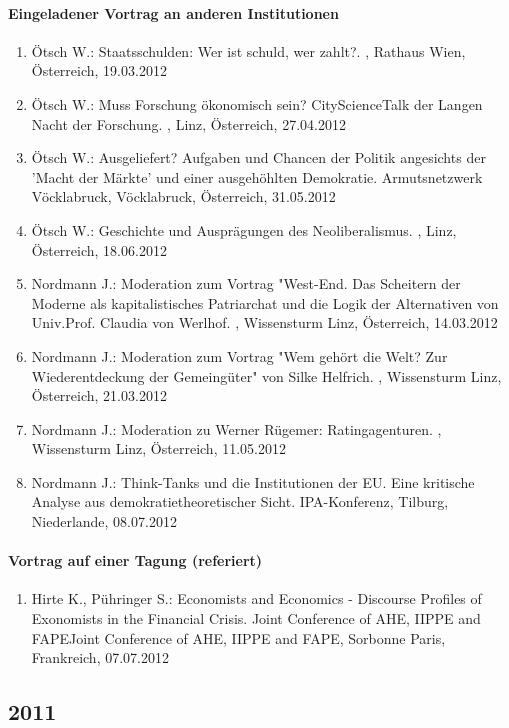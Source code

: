 \paragraph{Eingeladener Vortrag an anderen Institutionen}
\begin{enumerate}
	\item Ötsch W.: Staatsschulden: Wer ist schuld, wer zahlt?. , Rathaus Wien, Österreich, 19.03.2012
	\item Ötsch W.: Muss Forschung ökonomisch sein? CityScienceTalk der Langen Nacht der Forschung. , Linz, Österreich, 27.04.2012
	\item Ötsch W.: Ausgeliefert? Aufgaben und Chancen der Politik angesichts der 'Macht der Märkte' und einer ausgehöhlten Demokratie. Armutsnetzwerk Vöcklabruck, Vöcklabruck, Österreich, 31.05.2012
	\item Ötsch W.: Geschichte und Ausprägungen des Neoliberalismus. , Linz, Österreich, 18.06.2012
	\item Nordmann J.: Moderation zum Vortrag "West-End. Das Scheitern der Moderne als kapitalistisches Patriarchat und die Logik der Alternativen von Univ.Prof. Claudia von Werlhof. , Wissensturm Linz, Österreich, 14.03.2012
	\item Nordmann J.: Moderation zum Vortrag "Wem gehört die Welt? Zur Wiederentdeckung der Gemeingüter" von Silke Helfrich. , Wissensturm Linz, Österreich, 21.03.2012
	\item Nordmann J.: Moderation zu Werner Rügemer: Ratingagenturen. , Wissensturm Linz, Österreich, 11.05.2012
	\item Nordmann J.: Think-Tanks und die Institutionen der EU. Eine kritische Analyse aus demokratietheoretischer Sicht. IPA-Konferenz, Tilburg, Niederlande, 08.07.2012
\end{enumerate}
\paragraph{Vortrag auf einer Tagung (referiert)}
\begin{enumerate}
	\item Hirte K., Pühringer S.: Economists and Economics - Discourse Profiles of Exonomists in the Financial Crisis. Joint Conference of AHE, IIPPE and FAPEJoint Conference of AHE, IIPPE and FAPE, Sorbonne Paris, Frankreich, 07.07.2012
\end{enumerate}
\subsection*{2011}
